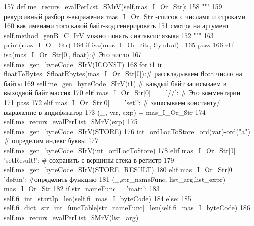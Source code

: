 \begin{DoxyCode}
157  \textcolor{keyword}{def }me\_recurs\_evalPerList\_SMrV(self,mas\_I\_Or\_Str):
158     \textcolor{stringliteral}{"""}
159 \textcolor{stringliteral}{         рекурсивный разбор s-выражения mas\_I\_Or\_Str -список с числами и строками }
160 \textcolor{stringliteral}{         как именами того какой байт-код генерировать}
161 \textcolor{stringliteral}{         смотря на аргумент self.method\_genB\_C\_IrV можно понять синтаксис языка }
162 \textcolor{stringliteral}{    """}     
163     print(mas\_I\_Or\_Str)
164     \textcolor{keywordflow}{if} isa(mas\_I\_Or\_Str, Symbol) : 
165         \textcolor{keywordflow}{pass}
166     \textcolor{keywordflow}{elif}  isa(mas\_I\_Or\_Str[0], float):\textcolor{comment}{# Это число}
167         self.me\_gen\_byteCode\_SIrV(ICONST)
168         \textcolor{keywordflow}{for} i1 \textcolor{keywordflow}{in} floatToBytes\_SfloatRbytes(mas\_I\_Or\_Str[0]):\textcolor{comment}{# расскладываем float число на байты }
169             self.me\_gen\_byteCode\_SIrV(i1)  \textcolor{comment}{# каждый байт записываем в выходной байт массив  }
170     \textcolor{keywordflow}{elif} mas\_I\_Or\_Str[0] == \textcolor{stringliteral}{'//'}: \textcolor{comment}{# Это комментарии}
171         \textcolor{keywordflow}{pass}
172     \textcolor{keywordflow}{elif} mas\_I\_Or\_Str[0] == \textcolor{stringliteral}{'set!'}: \textcolor{comment}{# записываем константу/выражение в индификатор}
173         (\_, var, exp) = mas\_I\_Or\_Str
174         self.me\_recurs\_evalPerList\_SMrV(exp)
175         self.me\_gen\_byteCode\_SIrV(STORE)
176         int\_ordLocToStore=ord(var)-ord(\textcolor{stringliteral}{"a"}) \textcolor{comment}{# определим индекс буквы}
177         self.me\_gen\_byteCode\_SIrV(int\_ordLocToStore)
178     \textcolor{keywordflow}{elif} mas\_I\_Or\_Str[0] == \textcolor{stringliteral}{'setResult!'}:  \textcolor{comment}{# сохранить с вершины стека в регистр }
179         self.me\_gen\_byteCode\_SIrV(STORE\_RESULT)         
180     \textcolor{keywordflow}{elif} mas\_I\_Or\_Str[0] == \textcolor{stringliteral}{'defun'}: \textcolor{comment}{#определить функцию          }
181         (\_,str\_nameFunc, list\_arg,list\_expr) = mas\_I\_Or\_Str
182         \textcolor{keywordflow}{if} str\_nameFunc==\textcolor{stringliteral}{'main'}:
183             self.fi\_int\_startIp=len(self.fi\_mas\_I\_byteCode)
184         \textcolor{keywordflow}{else}:  
185             self.fi\_dict\_str\_int\_funcTable[str\_nameFunc]=len(self.fi\_mas\_I\_byteCode)
186         self.me\_recurs\_evalPerList\_SMrV(list\_arg)    

\end{DoxyCode}
